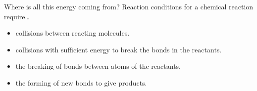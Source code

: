 \documentclass[handout]{beamer}
\begin{document}

\begin{frame}{Where is all this energy coming from?}
	\alert{Reaction conditions} for a chemical reaction require\ldots
	\begin{itemize}
		\item collisions between reacting molecules.
		\item collisions with sufficient energy to break the bonds in
			the reactants.
		\item the breaking of bonds between atoms of the reactants.
		\item the forming of new bonds to give products.
	\end{itemize}
\end{frame}
\end{document}
